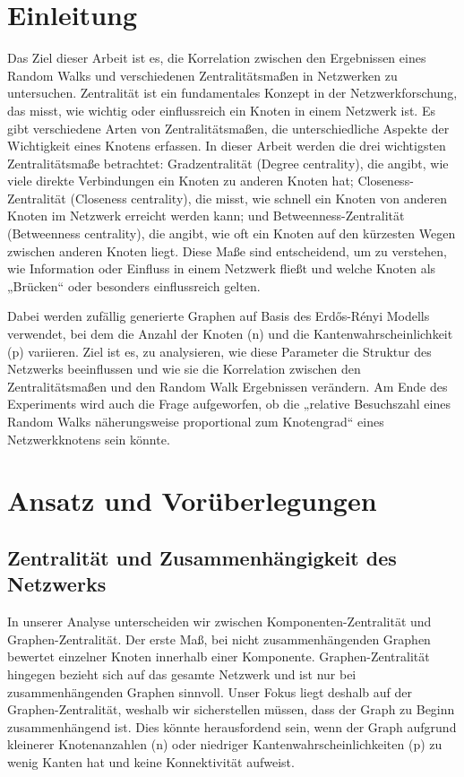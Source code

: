 %

\section{Einleitung}
Das Ziel dieser Arbeit ist es, die Korrelation zwischen den Ergebnissen eines Random Walks und verschiedenen Zentralitätsmaßen in Netzwerken zu untersuchen. Zentralität ist ein fundamentales Konzept in der Netzwerkforschung, das misst, wie wichtig oder einflussreich ein Knoten in einem Netzwerk ist. Es gibt verschiedene Arten von Zentralitätsmaßen, die unterschiedliche Aspekte der Wichtigkeit eines Knotens erfassen. In dieser Arbeit werden die drei wichtigsten Zentralitätsmaße betrachtet: Gradzentralität (Degree centrality), die angibt, wie viele direkte Verbindungen ein Knoten zu anderen Knoten hat; Closeness-Zentralität (Closeness centrality), die misst, wie schnell ein Knoten von anderen Knoten im Netzwerk erreicht werden kann; und Betweenness-Zentralität (Betweenness centrality), die angibt, wie oft ein Knoten auf den kürzesten Wegen zwischen anderen Knoten liegt. Diese Maße sind entscheidend, um zu verstehen, wie Information oder Einfluss in einem Netzwerk fließt und welche Knoten als „Brücken“ oder besonders einflussreich gelten. 

Dabei werden zufällig generierte Graphen auf Basis des Erdős-Rényi Modells verwendet, bei dem die Anzahl der Knoten (n) und die Kantenwahrscheinlichkeit (p) variieren. Ziel ist es, zu analysieren, wie diese Parameter die Struktur des Netzwerks beeinflussen und wie sie die Korrelation zwischen den Zentralitätsmaßen und den Random Walk Ergebnissen verändern. Am Ende des Experiments wird auch die Frage aufgeworfen, ob die „relative Besuchszahl eines Random Walks näherungsweise proportional zum Knotengrad“ eines Netzwerkknotens sein könnte. 

\section{Ansatz und Vorüberlegungen}
\subsection{Zentralität und Zusammenhängigkeit des Netzwerks}
 In 	unserer Analyse unterscheiden wir zwischen Komponenten-Zentralität und Graphen-Zentralität. Der erste Maß, bei nicht zusammenhängenden Graphen bewertet einzelner Knoten innerhalb einer 	Komponente. Graphen-Zentralität hingegen bezieht sich auf das gesamte Netzwerk und ist nur bei zusammenhängenden Graphen 	sinnvoll. Unser Fokus liegt deshalb auf der Graphen-Zentralität, 	weshalb wir sicherstellen müssen, dass der Graph zu Beginn	zusammenhängend ist. Dies könnte herausfordend sein, wenn der Graph aufgrund kleinerer Knotenanzahlen (n) oder niedriger Kantenwahrscheinlichkeiten (p) zu wenig Kanten hat und keine Konnektivität aufweist. 
 
